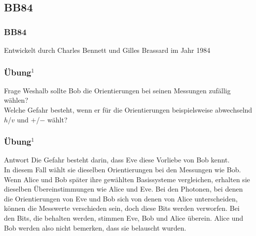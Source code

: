 \subsection{BB84}
\begin{frame}%
	\frametitle{BB84}
	Entwickelt durch Charles Bennett und Gilles Brassard im Jahr 1984
\end{frame}

\begin{frame}
	\frametitle{{\"U}bung${^1}$}
	\begin{block}{Frage}
		Weshalb sollte Bob die Orientierungen bei seinen Messungen zuf{\"a}llig w{\"a}hlen?\\
		Welche Gefahr besteht, wenn er f{\"u}r die Orientierungen beispielsweise abwechselnd $h$/$v$ und $+$/$-$ w{\"a}hlt?
	\end{block}
\end{frame}

\begin{frame}
	\frametitle{{\"U}bung${^1}$}
	\begin{block}{Antwort}
	Die Gefahr besteht darin, dass Eve diese Vorliebe von Bob kennt. 
	\\
	\justifying
	In diesem Fall wählt sie dieselben Orientierungen bei den Messungen wie Bob. Wenn Alice und Bob später ihre gewählten Basissysteme vergleichen, erhalten sie dieselben Übereinstimmungen wie Alice und Eve. Bei den Photonen, bei denen die Orientierungen von Eve und Bob sich von denen von Alice unterscheiden, können die Messwerte verschieden sein, doch diese Bits werden verworfen. Bei den Bits, die behalten werden, stimmen Eve, Bob und Alice überein. Alice und Bob werden also nicht bemerken, dass sie belauscht wurden.
	\end{block}
\end{frame}
